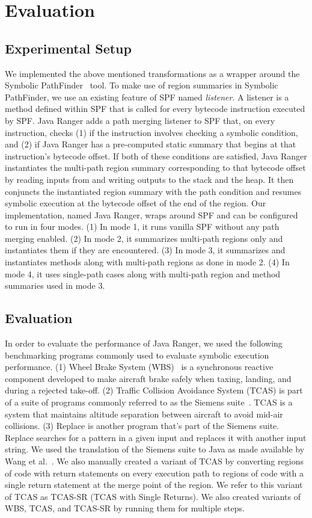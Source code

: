 \section{Evaluation}
\label{sec:results}
\subsection{Experimental Setup}
We implemented the above mentioned transformations as a wrapper around the Symbolic PathFinder~\cite{spf} tool.
%
To make use of region summaries in Symbolic PathFinder, we use an existing feature of SPF named \textit{listener}.
%
A listener is a method defined within SPF that is called for every bytecode instruction executed by SPF.
%
Java Ranger adds a path merging listener to SPF that, on every instruction, checks (1) if the instruction involves
checking a symbolic condition, and (2) if Java Ranger has a pre-computed static summary that begins at that
instruction\rq s bytecode offset.
%
If both of these conditions are satisfied, Java Ranger instantiates the multi-path region summary corresponding to that
bytecode offset by reading inputs from and writing outputs to the stack and the heap.
%
It then conjuncts the instantiated region summary with the path condition and resumes symbolic execution at the
bytecode offset of the end of the region.
%
Our implementation, named Java Ranger, wraps around SPF and can be configured to run in four modes.
%
(1) In mode 1, it runs vanilla SPF without any path merging enabled.
%
(2) In mode 2, it summarizes multi-path regions only and instantiates them if they are encountered.
%
(3) In mode 3, it summarizes and instantiates methods along with multi-path regions as done in mode 2.
%
(4) In mode 4, it uses single-path cases along with multi-path region and method summaries used in mode 3.
%
\subsection{Evaluation}

%
%
In order to evaluate the performance of Java Ranger, we used the following benchmarking programs commonly used to evaluate symbolic
execution performance.
%
(1) Wheel Brake System (WBS)~\cite{yang2014directed} is a synchronous reactive
component developed to make aircraft brake safely when taxing, landing, and during a rejected take-off.
%
(2) Traffic Collision Avoidance System (TCAS) is part of a suite of programs commonly referred to as the Siemens
suite~\cite{siemens-benchmarks}. TCAS is a system that maintains altitude separation between aircraft to avoid mid-air
collisions.
%
(3) Replace is another program that\rq s part of the Siemens suite. Replace searches for a pattern in a given input and
replaces it with another input string.
%
We used the translation of the Siemens suite to Java as made available by Wang et al.~\cite{dgse}.
%
We also manually created a variant of TCAS by converting regions of code with return statements on
every execution path to regions of code with a single return statement at the merge point of the region.
%
We refer to this variant of TCAS as TCAS-SR (TCAS with Single Returns).
%
We also created variants of WBS, TCAS, and TCAS-SR by running them for multiple steps.
%

